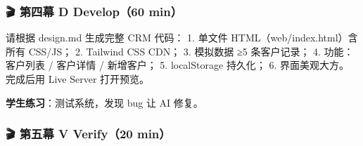 \documentclass[
  american,
  chinese,
]{ctexart}
\begin{document}
\subsubsection{\texorpdfstring{\foreignlanguage{american}{🎬 }{\foreignlanguage{american}{第四幕}}\foreignlanguage{american}{ D Develop}\foreignlanguage{american}{（}\foreignlanguage{american}{60 min}\foreignlanguage{american}{）}}{🎬 第四幕 D Develop（60 min）}}\label{ux7b2cux56dbux5e55-d-develop60-min}

{\foreignlanguage{american}{请根据}}\foreignlanguage{american}{ design.md }{\foreignlanguage{american}{生成完整}}\foreignlanguage{american}{ CRM }{\foreignlanguage{american}{代码}}\foreignlanguage{american}{：}\foreignlanguage{american}{ 1. }{\foreignlanguage{american}{单文件}}\foreignlanguage{american}{ {HTML{（}web}/{index.html{）含所有}}
CSS/JS}\foreignlanguage{american}{；}\foreignlanguage{american}{ 2. Tailwind CSS CDN}\foreignlanguage{american}{；}\foreignlanguage{american}{ 3. }{\foreignlanguage{american}{模拟数据}}\foreignlanguage{american}{ ≥5 }{\foreignlanguage{american}{条客户记录}}\foreignlanguage{american}{；}\foreignlanguage{american}{ 4. }{\foreignlanguage{american}{功能：客户列表}}\foreignlanguage{american}{ / }{\foreignlanguage{american}{客户详情}}\foreignlanguage{american}{ / }{\foreignlanguage{american}{新增客户}}\foreignlanguage{american}{；}\foreignlanguage{american}{ 5. {localStorage} }{\foreignlanguage{american}{持久化}}\foreignlanguage{american}{；}\foreignlanguage{american}{ 6. }{\foreignlanguage{american}{界面美观大方}}\foreignlanguage{american}{。}\foreignlanguage{american}{ }{\foreignlanguage{american}{完成后用}}\foreignlanguage{american}{ Live Server }{\foreignlanguage{american}{打开预览}}\foreignlanguage{american}{。}\foreignlanguage{american}{ }

{\textbf{\foreignlanguage{american}{学生练习}}\foreignlanguage{american}{：测试系统，发现}}\foreignlanguage{american}{ bug }\foreignlanguage{american}{让}\foreignlanguage{american}{ AI }{\foreignlanguage{american}{修复}}\foreignlanguage{american}{。}

\subsubsection{\texorpdfstring{\foreignlanguage{american}{🎬 }{\foreignlanguage{american}{第五幕}}\foreignlanguage{american}{ V Verify}\foreignlanguage{american}{（}\foreignlanguage{american}{20 min}\foreignlanguage{american}{）}}{🎬 第五幕 V Verify（20 min）}}\label{ux7b2cux4e94ux5e55-v-verify20-min}
\end{document}
